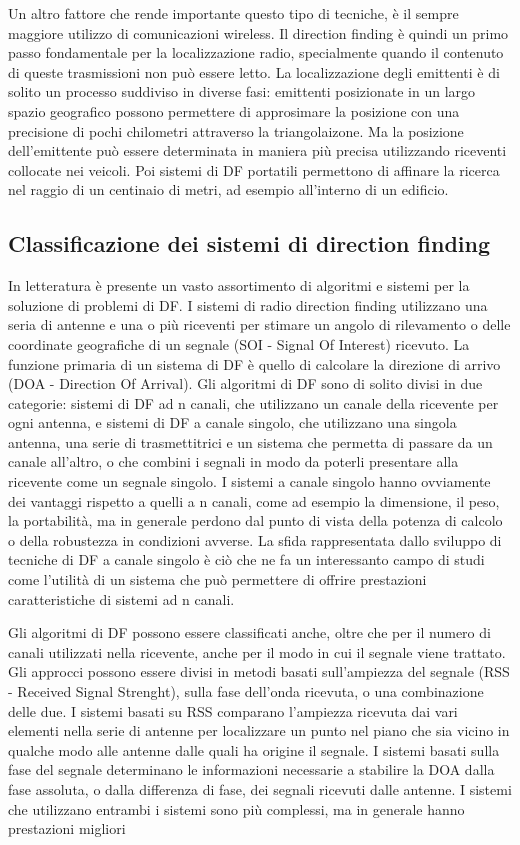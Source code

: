 Un altro fattore che rende importante questo tipo di tecniche, è il sempre maggiore utilizzo di comunicazioni wireless. Il direction finding è quindi un primo passo fondamentale per la localizzazione radio, specialmente quando il contenuto di queste trasmissioni non può essere letto. La localizzazione degli emittenti è di solito un processo suddiviso in diverse fasi: emittenti posizionate in un largo spazio geografico possono permettere di approsimare la posizione con una precisione di pochi chilometri attraverso la triangolaizone. Ma la posizione dell'emittente può essere determinata in maniera più precisa utilizzando riceventi collocate nei veicoli. Poi sistemi di DF portatili permettono di affinare la ricerca nel raggio di un centinaio di metri, ad esempio all'interno di un edificio.



\subsection{Classificazione dei sistemi di direction finding}

In letteratura è presente un vasto assortimento di algoritmi e sistemi per la soluzione di problemi di DF.
I sistemi di radio direction finding utilizzano una seria di antenne e una o più riceventi per stimare un angolo di rilevamento o delle coordinate geografiche di un segnale (SOI - Signal Of Interest) ricevuto. La funzione primaria di un sistema di DF è quello di calcolare la direzione di arrivo (DOA - Direction Of Arrival). 
Gli algoritmi di DF sono di solito divisi in due categorie: sistemi di DF ad n canali, che utilizzano un canale della ricevente per ogni antenna, e sistemi di DF a canale singolo, che utilizzano una singola antenna, una serie di trasmettitrici e un sistema che permetta di passare da un canale all'altro, o che combini i segnali in modo da poterli presentare alla ricevente come un segnale singolo. I sistemi a canale singolo hanno ovviamente dei vantaggi rispetto a quelli a n canali, come ad esempio la dimensione, il peso, la portabilità, ma in generale perdono dal punto di vista della potenza di calcolo o della robustezza in condizioni avverse. La sfida rappresentata dallo sviluppo di tecniche di DF a canale singolo è ciò che ne fa un interessanto campo di studi come l'utilità di un sistema che può permettere di offrire prestazioni caratteristiche di sistemi ad n canali.

Gli algoritmi di DF possono essere classificati anche, oltre che per il numero di canali utilizzati nella ricevente, anche per il modo in cui il segnale viene trattato. Gli approcci possono essere divisi in metodi basati sull'ampiezza del segnale (RSS - Received Signal Strenght), sulla fase	dell'onda ricevuta, o una combinazione delle due. I sistemi basati su RSS comparano l'ampiezza ricevuta dai vari elementi nella serie di antenne per localizzare un punto nel piano che sia vicino in qualche modo alle antenne dalle quali ha origine il segnale. I sistemi basati sulla fase del segnale determinano le informazioni necessarie a stabilire la DOA dalla fase assoluta, o dalla differenza di fase, dei segnali ricevuti dalle antenne. I sistemi che utilizzano entrambi i sistemi sono più complessi, ma in generale hanno prestazioni migliori

